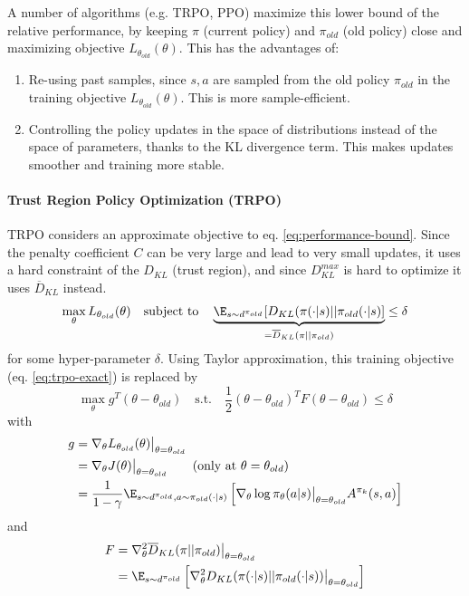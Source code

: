 A number of algorithms (e.g. TRPO, PPO) maximize this lower bound of the relative performance, by keeping $\pi$ (current policy) and $\pi_{old}$ (old policy) close and maximizing objective $L_{\theta_{old}}(\theta)$. This has the advantages of:
\begin{enumerate}
    \item Re-using past samples, since $s,a$ are sampled from the old policy $\pi_{old}$ in the training objective $L_{\theta_{old}}(\theta)$. This is more sample-efficient.
    \item Controlling the policy updates in the space of distributions instead of the space of parameters, thanks to the KL divergence term. This makes updates smoother and training more stable.
\end{enumerate}

\paragraph{Trust Region Policy Optimization (TRPO) \cite{schulman2015trust}}
TRPO considers an approximate objective to eq. \ref{eq:performance-bound}. Since the penalty coefficient $C$ can be very large and lead to very small updates, it uses a hard constraint of the $D_{KL}$ (trust region), and since $D_{KL}^{max}$ is hard to optimize it uses $\overline{D}_{KL}$ instead.
\begin{equation}
    \max_\theta L_{\theta_{old}}(\theta) 
    \quad \text{subject to} \quad
    \underbrace{
        \E_{s \sim d^{\pi_{old}}}[D_{KL}(\pi(\cdot|s) || \pi_{old}(\cdot|s)]
    }_{=\overline{D}_{KL}(\pi||\pi_{old})}
    \leq \delta    
\label{eq:trpo-exact}
\end{equation}
for some hyper-parameter $\delta$.
Using Taylor approximation, this training objective (eq. \ref{eq:trpo-exact}) is replaced by
\begin{equation}
    \max_\theta g^T (\theta - \theta_{old})
    \quad \text{s.t.} \quad
    \frac{1}{2}(\theta-\theta_{old})^T F (\theta-\theta_{old}) \leq \delta
\label{eq:trpo-taylor-approx}
\end{equation}
with
\begin{align*}
g 
    &= \nabla_\theta L_{\theta_{old}}(\theta)\big|_{\theta=\theta_{old}} \\
    &= \nabla_\theta J(\theta)\big|_{\theta=\theta_{old}} 
    \qquad \text{(only at $\theta=\theta_{old}$)} \\
    &= \frac{1}{1-\gamma} 
    \E_{s\sim d^{\pi_{old}}, a \sim \pi_{old}(\cdot|s)}\left[
        \nabla_\theta \log \pi_\theta(a|s)\big|_{\theta=\theta_{old}} A^{\pi_k}(s,a)
    \right]
\end{align*}
and
\begin{align*}
F 
    &= \nabla^2_\theta \overline{D}_{KL}(\pi||\pi_{old})\big|_{\theta=\theta_{old}} \\
    &= \E_{s\sim d^{\pi_{old}}}\left[
        \nabla^2_\theta D_{KL}(\pi(\cdot|s)||\pi_{old}(\cdot|s))\big|_{\theta=\theta_{old}}
    \right]
\end{align*}

